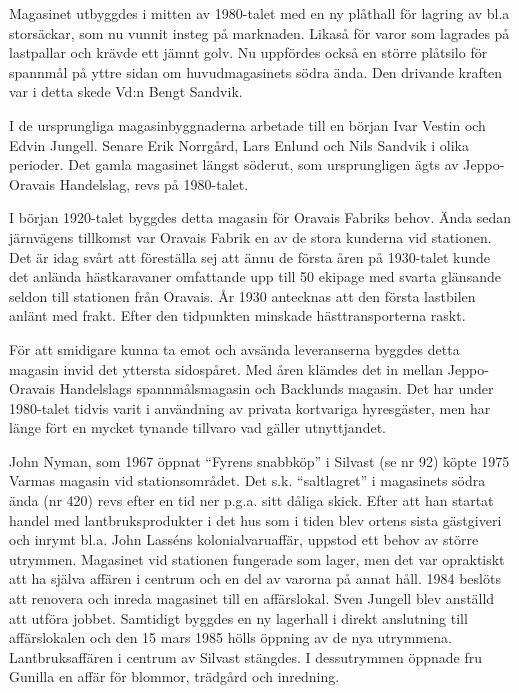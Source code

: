 {
Magasinet utbyggdes i mitten av 1980-talet med en ny plåthall för lagring av bl.a storsäckar, som nu vunnit insteg på marknaden. Likaså för varor som lagrades på lastpallar och krävde ett jämnt golv. Nu uppfördes också en större plåtsilo för spannmål på yttre sidan om huvudmagasinets södra ända. Den drivande kraften var i detta skede Vd:n Bengt Sandvik.

I de ursprungliga magasinbyggnaderna arbetade till en början Ivar Vestin och Edvin Jungell. Senare Erik Norrgård, Lars Enlund och Nils Sandvik i olika perioder. Det gamla magasinet längst söderut, som ursprungligen ägts av Jeppo-Oravais Handelslag, revs på 1980-talet.




\jhnooccupant{}


I  början 1920-talet byggdes detta magasin för Oravais Fabriks behov. Ända sedan järnvägens tillkomst var Oravais Fabrik en av de stora kunderna vid stationen. Det är idag svårt att föreställa sej att ännu de första åren på 1930-talet kunde det anlända hästkaravaner omfattande upp till 50 ekipage med svarta glänsande seldon till stationen från Oravais. År 1930 antecknas att den första lastbilen anlänt med frakt. Efter den tidpunkten minskade hästtransporterna raskt.

För att smidigare kunna ta emot och avsända leveranserna byggdes detta magasin invid det yttersta sidospåret. Med åren klämdes det in mellan Jeppo-Oravais Handelslags spannmålsmagasin och Backlunds magasin. Det har under 1980-talet tidvis varit i användning av privata kortvariga hyresgäster, men har länge fört en mycket tynande tillvaro vad gäller utnyttjandet.





John Nyman, som 1967 öppnat ``Fyrens snabbköp'' i Silvast (se nr 92) köpte 1975 Varmas magasin vid stationsområdet. Det s.k. ``saltlagret'' i magasinets södra ända (nr 420) revs efter en tid ner p.g.a. sitt dåliga skick. Efter att han startat handel med lantbruksprodukter i det hus som i tiden blev ortens sista gästgiveri och inrymt bl.a. John Lasséns kolonialvaruaffär, uppstod ett behov av större utrymmen. Magasinet vid stationen fungerade som lager, men det var opraktiskt att ha själva affären i centrum och en del av varorna på annat håll. 1984 beslöts att renovera  och inreda magasinet till en affärslokal. Sven Jungell blev anställd att utföra jobbet. Samtidigt byggdes en ny lagerhall i direkt anslutning till affärslokalen och den 15 mars 1985 hölls öppning av de nya utrymmena. Lantbruksaffären i centrum av Silvast stängdes. I dessutrymmen öppnade fru Gunilla en affär för blommor, trädgård och inredning.

}
